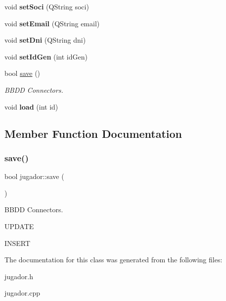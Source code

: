 \begin{DoxyCompactItemize}
\item 
\mbox{\label{classjugador_a684e5c98a3c39214b93923615d1a2fb2}} 
void {\bfseries set\+Soci} (Q\+String soci)
\item 
\mbox{\label{classjugador_a75f1d73c24c859503450958bbf1d48ea}} 
void {\bfseries set\+Email} (Q\+String email)
\item 
\mbox{\label{classjugador_a442a923a8704d783a9b0b7ce917a7e39}} 
void {\bfseries set\+Dni} (Q\+String dni)
\item 
\mbox{\label{classjugador_aa0fd016230cc38f0ac2e7cd6c90003d3}} 
void {\bfseries set\+Id\+Gen} (int id\+Gen)
\item 
bool \mbox{\hyperlink{classjugador_af56aa410ca759cb4e3548af92de007b0}{save}} ()
\begin{DoxyCompactList}\small\item\em B\+B\+DD Connectors. \end{DoxyCompactList}\item 
\mbox{\label{classjugador_a9b57bb55fbd19cf2a1fee8397eeb0135}} 
void {\bfseries load} (int id)
\end{DoxyCompactItemize}


\subsection{Member Function Documentation}
\mbox{\label{classjugador_af56aa410ca759cb4e3548af92de007b0}} 
\subsubsection{\texorpdfstring{save()}{save()}}
{\footnotesize\ttfamily bool jugador\+::save (\begin{DoxyParamCaption}{ }\end{DoxyParamCaption})}



B\+B\+DD Connectors. 

U\+P\+D\+A\+TE

I\+N\+S\+E\+RT 

The documentation for this class was generated from the following files\+:\begin{DoxyCompactItemize}
\item 
jugador.\+h\item 
jugador.\+cpp\end{DoxyCompactItemize}
